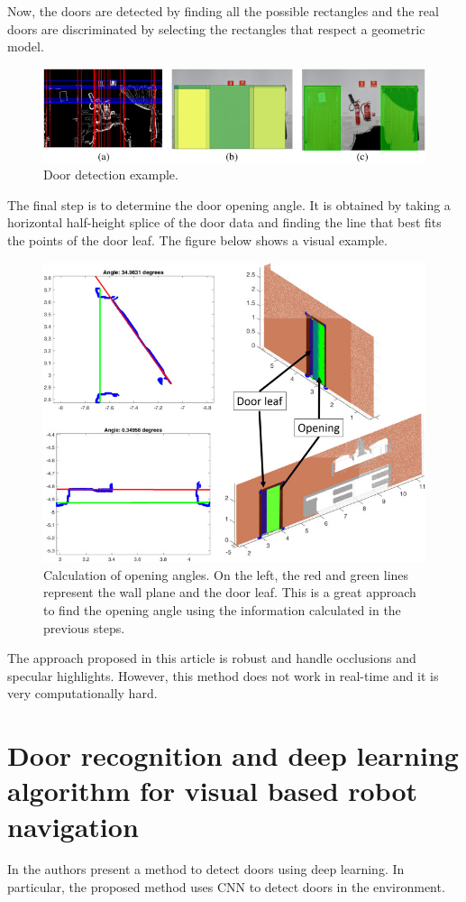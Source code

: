 Now, the doors are detected by finding all the possible rectangles and the real doors are discriminated by selecting the rectangles that respect a geometric model.

\begin{figure}[h!]
	\centering
	\includegraphics[width=0.9\linewidth]{images/door_edges_det.jpg}
	\caption{Door detection example.}
\end{figure}

\newpage

The final step is to determine the door opening angle. It is obtained
by taking a horizontal half-height splice of the door data and finding the
line that best fits the points of the door leaf. The figure below shows a visual example.

\begin{figure}[h!]
	\centering
	\includegraphics[width=0.7\linewidth]{images/opening_angles.jpg}
	\caption{Calculation of opening angles. On the left, the red and green lines represent the wall plane and the door leaf. This is a great approach to find the opening angle using the information calculated in the previous steps.}
\end{figure}

The approach proposed in this article is robust and handle occlusions and specular highlights. However, this method does not work in real-time and it is very computationally hard. 

\newpage

\section{Door recognition and deep learning algorithm for visual based robot navigation \cite{7090595}}
In \cite{7090595} the authors present a method to detect doors using deep learning. In particular, the proposed method uses CNN to detect doors in the environment. 

